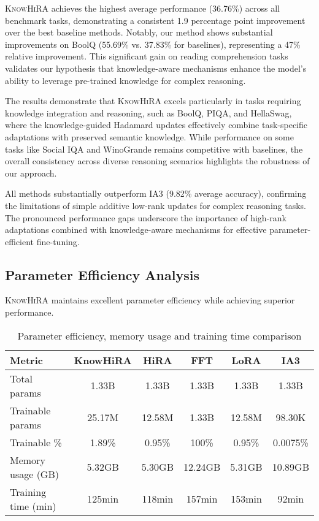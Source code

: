 \documentclass[10pt,letterpaper]{article}
\begin{document}
\textsc{KnowHiRA} achieves the highest average performance (36.76\%) across all benchmark tasks, demonstrating a consistent 1.9 percentage point improvement over the best baseline methods. Notably, our method shows substantial improvements on BoolQ (55.69\% vs. 37.83\% for baselines), representing a 47\% relative improvement. This significant gain on reading comprehension tasks validates our hypothesis that knowledge-aware mechanisms enhance the model's ability to leverage pre-trained knowledge for complex reasoning.

The results demonstrate that \textsc{KnowHiRA} excels particularly in tasks requiring knowledge integration and reasoning, such as BoolQ, PIQA, and HellaSwag, where the knowledge-guided Hadamard updates effectively combine task-specific adaptations with preserved semantic knowledge. While performance on some tasks like Social IQA and WinoGrande remains competitive with baselines, the overall consistency across diverse reasoning scenarios highlights the robustness of our approach.

All methods substantially outperform IA3 (9.82\% average accuracy), confirming the limitations of simple additive low-rank updates for complex reasoning tasks. The pronounced performance gaps underscore the importance of high-rank adaptations combined with knowledge-aware mechanisms for effective parameter-efficient fine-tuning.



\subsection{Parameter Efficiency Analysis}

\textsc{KnowHiRA} maintains excellent parameter efficiency while achieving superior performance. 

\begin{table}[h]
\centering
\caption{Parameter efficiency, memory usage and training time comparison}
\label{tab:efficiency_comparison}
\begin{tabular}{lccccc}
\toprule
\textbf{Metric} & \textbf{KnowHiRA} & \textbf{HiRA} & \textbf{FFT} & \textbf{LoRA} & \textbf{IA3} \\
\midrule
Total params & 1.33B & 1.33B & 1.33B & 1.33B & 1.33B \\
Trainable params & 25.17M & 12.58M & 1.33B & 12.58M & 98.30K \\
Trainable \% & 1.89\% & 0.95\% & 100\% & 0.95\% & 0.0075\% \\
Memory usage (GB) & 5.32GB & 5.30GB & 12.24GB & 5.31GB & 10.89GB \\
Training time (min) & 125min & 118min & 157min & 153min & 92min \\
\bottomrule
\end{tabular}
\end{table}
\end{document}
